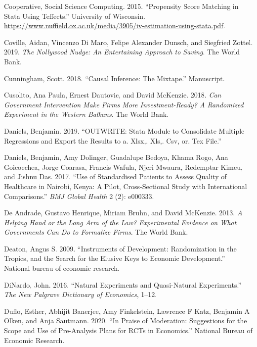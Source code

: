 \documentclass[
]{book}
\begin{document}
\leavevmode\hypertarget{ref-sscc2015}{}%
Cooperative, Social Science Computing. 2015. ``Propensity Score Matching in Stata Using Teffects.'' University of Wisconsin. \url{https://www.nuffield.ox.ac.uk/media/3905/iv-estimation-using-stata.pdf}.

\leavevmode\hypertarget{ref-coville2019nollywood}{}%
Coville, Aidan, Vincenzo Di Maro, Felipe Alexander Dunsch, and Siegfried Zottel. 2019. \emph{The Nollywood Nudge: An Entertaining Approach to Saving}. The World Bank.

\leavevmode\hypertarget{ref-cunningham2018causal}{}%
Cunningham, Scott. 2018. ``Causal Inference: The Mixtape.'' Manuscript.

\leavevmode\hypertarget{ref-cusolito2018can}{}%
Cusolito, Ana Paula, Ernest Dautovic, and David McKenzie. 2018. \emph{Can Government Intervention Make Firms More Investment-Ready? A Randomized Experiment in the Western Balkans}. The World Bank.

\leavevmode\hypertarget{ref-daniels2019outwrite}{}%
Daniels, Benjamin. 2019. ``OUTWRITE: Stata Module to Consolidate Multiple Regressions and Export the Results to a. Xlsx,. Xls,. Csv, or. Tex File.''

\leavevmode\hypertarget{ref-daniels2017use}{}%
Daniels, Benjamin, Amy Dolinger, Guadalupe Bedoya, Khama Rogo, Ana Goicoechea, Jorge Coarasa, Francis Wafula, Njeri Mwaura, Redemptar Kimeu, and Jishnu Das. 2017. ``Use of Standardised Patients to Assess Quality of Healthcare in Nairobi, Kenya: A Pilot, Cross-Sectional Study with International Comparisons.'' \emph{BMJ Global Health} 2 (2): e000333.

\leavevmode\hypertarget{ref-de2013helping}{}%
De Andrade, Gustavo Henrique, Miriam Bruhn, and David McKenzie. 2013. \emph{A Helping Hand or the Long Arm of the Law? Experimental Evidence on What Governments Can Do to Formalize Firms}. The World Bank.

\leavevmode\hypertarget{ref-deaton2009}{}%
Deaton, Angus S. 2009. ``Instruments of Development: Randomization in the Tropics, and the Search for the Elusive Keys to Economic Development.'' National bureau of economic research.

\leavevmode\hypertarget{ref-dinardo2016natural}{}%
DiNardo, John. 2016. ``Natural Experiments and Quasi-Natural Experiments.'' \emph{The New Palgrave Dictionary of Economics}, 1--12.

\leavevmode\hypertarget{ref-duflo2020praise}{}%
Duflo, Esther, Abhijit Banerjee, Amy Finkelstein, Lawrence F Katz, Benjamin A Olken, and Anja Sautmann. 2020. ``In Praise of Moderation: Suggestions for the Scope and Use of Pre-Analysis Plans for RCTs in Economics.'' National Bureau of Economic Research.
\end{document}
